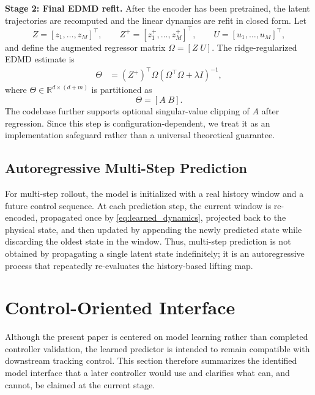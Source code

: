 \documentclass[journal]{IEEEtran}
\begin{document}
\textbf{Stage 2: Final EDMD refit.} After the encoder has been pretrained, the latent trajectories are recomputed and the linear dynamics are refit in closed form. Let
\begin{equation}
    Z=[z_1,\ldots,z_M]^\top,
    \qquad
    Z^{+}=[z_1^{+},\ldots,z_M^{+}]^\top,
    \qquad
    U=[u_1,\ldots,u_M]^\top,
\end{equation}
and define the augmented regressor matrix $\Omega=[Z\;U]$. The ridge-regularized EDMD estimate is
\begin{equation}
\begin{aligned}
    \Theta &= (Z^{+})^\top \Omega
    \left(\Omega^\top\Omega + \lambda I\right)^{-1},
\end{aligned}
    \label{eq:edmd_solution}
\end{equation}
where $\Theta \in \mathbb{R}^{d\times(d+m)}$ is partitioned as
\begin{equation}
    \Theta = [A\;B].
\end{equation}
The codebase further supports optional singular-value clipping of $A$ after regression. Since this step is configuration-dependent, we treat it as an implementation safeguard rather than a universal theoretical guarantee.

\subsection{Autoregressive Multi-Step Prediction}

For multi-step rollout, the model is initialized with a real history window and a future control sequence. At each prediction step, the current window is re-encoded, propagated once by \eqref{eq:learned_dynamics}, projected back to the physical state, and then updated by appending the newly predicted state while discarding the oldest state in the window. Thus, multi-step prediction is not obtained by propagating a single latent state indefinitely; it is an autoregressive process that repeatedly re-evaluates the history-based lifting map.

\section{Control-Oriented Interface}
\label{sec:control}

Although the present paper is centered on model learning rather than completed controller validation, the learned predictor is intended to remain compatible with downstream tracking control. This section therefore summarizes the identified model interface that a later controller would use and clarifies what can, and cannot, be claimed at the current stage.
\end{document}
